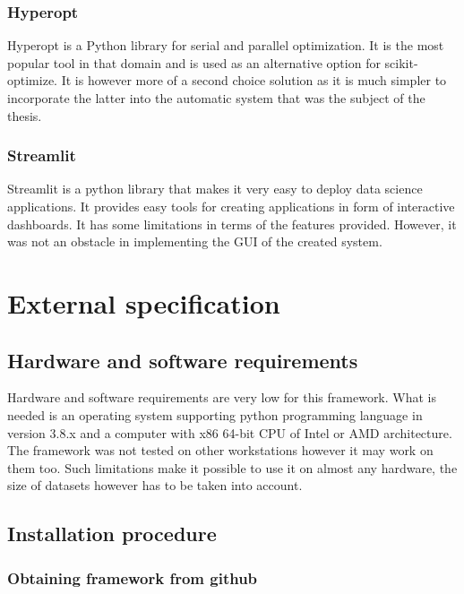 \documentclass[a4paper,twoside,12pt]{book}
\begin{document}
\subsection{Hyperopt}

Hyperopt is a Python library for serial and parallel optimization. It is the most popular tool in that domain and is used as an alternative option for scikit-optimize. It is however more of a second choice solution as it is much simpler to incorporate the latter into the automatic system that was the subject of the thesis.

\subsection{Streamlit}

Streamlit is a python library that makes it very easy to deploy data science applications. It provides easy tools for creating applications in form of interactive dashboards. It has some limitations in terms of the features provided. However, it was not an obstacle in implementing the GUI of the created system. 



\chapter{External specification}

\section{Hardware and software requirements}


Hardware and software requirements are very low for this framework. What is needed is an operating system supporting python programming language in version 3.8.x and a computer with x86 64-bit CPU of Intel or AMD architecture. The framework was not tested on other workstations however it may work on them too.
Such limitations make it possible to use it on almost any hardware, the size of datasets however has to be taken into account.

\section{Installation procedure}

\subsection{Obtaining framework from github}
\end{document}
